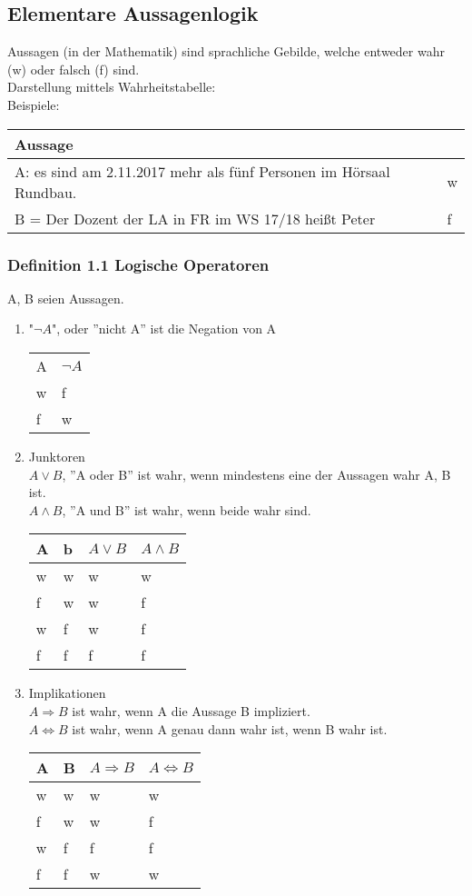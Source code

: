 \documentclass{scrartcl}
\begin{document}
\subsection{Elementare Aussagenlogik}
Aussagen (in der Mathematik) sind sprachliche Gebilde, welche entweder wahr (w) oder falsch (f) sind.\\
Darstellung mittels Wahrheitstabelle:\\
Beispiele:
\begin{tabular}{l | l}
Aussage\\
\hline
A: es sind am 2.11.2017 mehr als f\"unf Personen im H\"orsaal Rundbau. & w\\
\hline
B = Der Dozent der LA in FR im WS 17/18 hei\ss{}t Peter & f
\end{tabular}

\subsubsection{Definition 1.1 Logische Operatoren}
A, B seien Aussagen.
\begin{enumerate}
\item{"\(\neg A\)", oder ''nicht A'' ist die Negation von A\\
\begin{tabular}{l | l}
A & \(\neg A\)\\
w & f\\
f & w
\end{tabular}
}
\item{Junktoren\\
\(A \lor B\), ''A oder B'' ist wahr, wenn mindestens eine der Aussagen wahr A, B ist.\\
\(A \land B\), ''A und B'' ist wahr, wenn beide wahr sind.\\
\begin{tabular}{l | l | l | l}
A & b & \(A \lor B\) & \(A\land B\)\\
\hline
w & w & w & w\\
f & w & w & f\\
w & f & w & f\\
f & f & f & f
\end{tabular}
}
\item{Implikationen\\
\(A \Rightarrow B\) ist wahr, wenn A die Aussage B impliziert.\\
\(A \Leftrightarrow B\)  ist wahr, wenn A genau dann wahr ist, wenn B wahr ist.\\
\begin{tabular}{l | l | l | l}
A & B & \(A \Rightarrow B\) & \(A \Leftrightarrow B\)\\
\hline
w & w & w & w\\
f & w & w & f\\
w & f & f & f\\
f & f & w & w
\end{tabular}
}
\end{enumerate}
\end{document}
